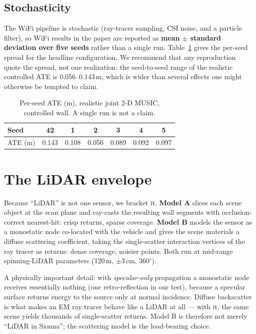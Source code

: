 \documentclass[journal]{IEEEtran}
\newcommand{\SI}[2]{#1\,#2}
\newcommand{\SIrange}[3]{#1--#2\,#3}
\providecommand{\degree}{\ensuremath{^\circ}}
\begin{document}
\subsection{Stochasticity}
The WiFi pipeline is stochastic (ray-tracer sampling, CSI noise, and a particle filter), so
WiFi results in the paper are reported as \textbf{mean $\pm$ standard deviation over five
seeds} rather than a single run. Table~\ref{tab:seeds} gives the per-seed spread for the
headline configuration. We recommend that any reproduction quote the spread, not one
realization: the seed-to-seed range of the realistic controlled ATE is
\SIrange{0.056}{0.143}{m}, which is wider than several effects one might otherwise be tempted
to claim.

\begin{table}[h]
\caption{Per-seed ATE (m), realistic joint 2-D MUSIC, controlled wall. A single run is not a
claim.}
\label{tab:seeds}
\centering
\footnotesize
\begin{tabular}{lcccccc}
\toprule
Seed & 42 & 1 & 2 & 3 & 4 & 5 \\
\midrule
ATE (m) & 0.143 & 0.108 & 0.056 & 0.089 & 0.092 & 0.097 \\
\bottomrule
\end{tabular}
\end{table}

\section{The LiDAR envelope}

Because ``LiDAR'' is not one sensor, we bracket it. \textbf{Model A} slices each scene
object at the scan plane and ray-casts the resulting wall segments with occlusion-correct
nearest-hit: crisp returns, sparse coverage. \textbf{Model B} models the sensor as a
monostatic node co-located with the vehicle and gives the scene materials a diffuse
scattering coefficient, taking the single-scatter interaction vertices of the ray tracer as
returns: dense coverage, noisier points. Both run at mid-range spinning-LiDAR parameters
(\SI{120}{m}, $\pm$\SI{3}{cm}, $360\degree$).

A physically important detail: with \emph{specular-only} propagation a monostatic node
receives essentially nothing (one retro-reflection in our test), because a specular surface
returns energy to the source only at normal incidence. Diffuse backscatter is what makes an
EM ray tracer behave like a LiDAR at all --- with it, the same scene yields thousands of
single-scatter returns. Model B is therefore not merely ``LiDAR in Sionna''; the scattering
model is the load-bearing choice.
\end{document}
